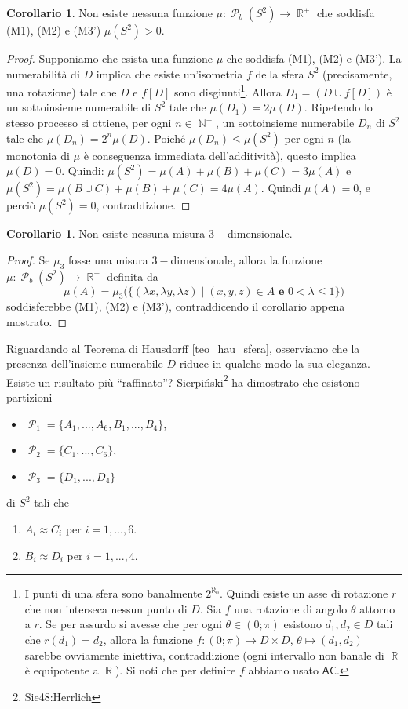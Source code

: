 \documentclass[12pt,a4paper]{report}
\theoremstyle{definition}
\newtheorem{corollario}[teo]{Corollario}  %
\theoremstyle{num.custom-title}
\DeclareMathOperator{\PP}{\mathcal{P}}
\DeclareMathOperator{\N}{\mathbb{N}}
\DeclareMathOperator{\R}{\mathbb{R}}
\newcommand{\AC}{\ensuremath{\mathsf{AC}}\xspace}
\begin{document}
\begin{corollario}
Non esiste nessuna funzione $\mu: \PP_b(S^2) \to \R^+$ che soddisfa (M1), (M2) e (M3') $\mu(S^2)>0$.
\begin{proof}
Supponiamo che esista una funzione $\mu$ che soddisfa (M1), (M2) e (M3'). La numerabilità di $D$ implica che esiste un'isometria $f$ della sfera $S^2$ (precisamente, una rotazione) tale che $D$ e $f[D]$ sono disgiunti\footnote{I punti di una sfera sono banalmente $2^{\aleph_0}$. Quindi esiste un asse di rotazione $r$ che non interseca nessun punto di $D$. Sia $f$ una rotazione di angolo $\theta$ attorno a $r$. Se per assurdo si avesse che per ogni $\theta \in (0;\pi)$ esistono $d_1, d_2 \in D$ tali che $r(d_1)=d_2$, allora la funzione $f : (0;\pi) \to D \times D$, $\theta \mapsto (d_1,d_2)$ sarebbe ovviamente iniettiva, contraddizione (ogni intervallo non banale di $\R$ è equipotente a $\R$). Si noti che per definire $f$ abbiamo usato \AC.}. Allora $D_1=(D \cup f[D])$ è un sottoinsieme numerabile di $S^2$ tale che $\mu(D_1)= 2\mu(D)$. Ripetendo lo stesso processo si ottiene, per ogni $n \in \N^+$, un sottoinsieme numerabile $D_n$ di $S^2$ tale che $\mu(D_n)=2^n \mu(D)$. Poiché $\mu(D_n) \leq \mu(S^2)$ per ogni $n$ (la monotonia di $\mu$ è conseguenza immediata dell'additività), questo implica $\mu(D)=0$. Quindi: $\mu(S^2)=\mu(A)+\mu(B)+\mu(C)=3 \mu(A)$ e $\mu(S^2)=\mu(B \cup C) + \mu(B) + \mu(C) = 4 \mu(A)$. Quindi $\mu(A)=0$, e perciò $\mu(S^2)=0$, contraddizione.
\end{proof}
\end{corollario}

\begin{corollario}
Non esiste nessuna misura $3-$dimensionale.
\begin{proof}
Se $\mu_3$ fosse una misura $3-$dimensionale, allora la funzione $\mu: \PP_b(S^2) \to \R^+$ definita da 
\[
\mu(A)=\mu_3 \big( \{(\lambda x, \lambda y, \lambda z) \mid (x,y,z) \in A \textbf{ e } 0<\lambda \leq 1\} \big)
\]
soddisferebbe (M1), (M2)	e (M3'), contraddicendo il corollario appena mostrato.
\end{proof}
\end{corollario}

Riguardando al Teorema di Hausdorff \ref{teo_hau_sfera}, osserviamo che la presenza dell'insieme numerabile $D$ riduce in qualche modo la sua eleganza. Esiste un risultato più ``raffinato''? Sierpiński\footnote{Sie48:Herrlich} ha dimostrato che esistono partizioni
\begin{itemize}
\item[] $\PP_1=\{A_1,...,A_6,B_1,...,B_4\}$,
\item[] $\PP_2=\{C_1,...,C_6\}$,
\item[] $\PP_3=\{D_1,...,D_4\}$
\end{itemize}
di $S^2$ tali che 
\begin{enumerate}
\item $A_i \approx C_i$ per $i=1,...,6$.
\item $B_i \approx D_i$ per $i=1,...,4$.
\end{enumerate}
\end{document}
